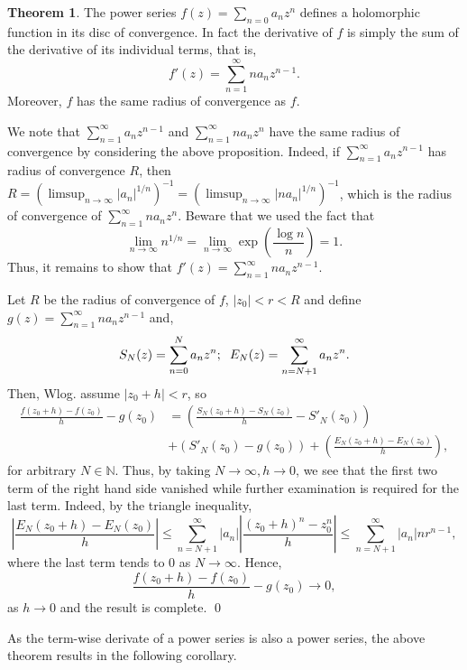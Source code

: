 \documentclass[
]{article}
\theoremstyle{definition}
\newtheorem{theorem}{Theorem}
\theoremstyle{definition}
\begin{document}
\begin{theorem}
  The power series \(f(z) = \sum_{n = 0} a_n z^n\) defines a holomorphic function 
  in its disc of convergence. In fact the derivative of \(f\) is simply the sum of 
  the derivative of its individual terms, that is, 
  \[f'(z) = \sum_{n = 1}^\infty n a_n z^{n - 1}.\]
  Moreover, \(f\) has the same 
  radius of convergence as \(f\).
\end{theorem}
\proof

We note that \(\sum_{n = 1}^\infty a_n z^{n - 1}\) and
\(\sum_{n = 1}^\infty na_n z^n\) have the same radius of convergence by
considering the above proposition. Indeed, if
\(\sum_{n = 1}^\infty a_n z^{n - 1}\) has radius of convergence \(R\),
then
\(R = (\limsup_{n \to \infty} \left| a_n \right|^{1 / n})^{-1}  = (\limsup_{n \to \infty} \left| n a_n \right|^{1 / n})^{-1}\),
which is the radius of convergence of \(\sum_{n = 1}^\infty na_n z^n\).
Beware that we used the fact that
\[\lim_{n \to \infty} n^{1 / n} = \lim_{n \to \infty} \exp \left(\frac{\log n}{n}\right) = 1.\]
Thus, it remains to show that
\(f'(z) = \sum_{n = 1}^\infty n a_n z^{n - 1}\).

Let \(R\) be the radius of convergence of \(f\),
\(\left| z_0 \right| < r < R\) and define
\(g(z) = \sum_{n = 1}^\infty n a_n z^{n - 1}\) and,
\[S_N(z) = \sum_{n = 0}^N a_n z^n; \hspace{2mm} E_N(z) = \sum_{n = N + 1}^\infty a_n z^n.\]
Then, Wlog. assume \(\left| z_0 + h \right| < r\), so \[\begin{split}
    \frac{f(z_0 + h) - f(z_0)}{h} - g(z_0) & = 
    \left(\frac{S_N(z_0 + h) - S_N(z_0)}{h} - S'_N(z_0)\right)\\ 
      & + (S'_N(z_0) - g(z_0)) + \left(\frac{E_N(z_0 + h) - E_N(z_0)}{h}\right),
    \end{split}\] for arbitrary \(N \in \mathbb{N}\). Thus, by taking
\(N \to \infty, h \to 0\), we see that the first two term of the right
hand side vanished while further examination is required for the last
term. Indeed, by the triangle inequality,
\[\left|\frac{E_N(z_0 + h) - E_N(z_0)}{h}\right| \le 
    \sum_{n = N + 1}^\infty \left|a_n\right| \left|\frac{(z_0 + h)^n - z_0^n}{h}\right| 
    \le \sum_{n = N + 1}^\infty \left| a_n \right| n r^{n - 1},\] where
the last term tends to \(0\) as \(N \to \infty\). Hence,
\[\frac{f(z_0 + h) - f(z_0)}{h} - g(z_0) \to 0,\] as \(h \to 0\) and the
result is complete. \qed

As the term-wise derivate of a power series is also a power series, the
above theorem results in the following corollary.
\end{document}
